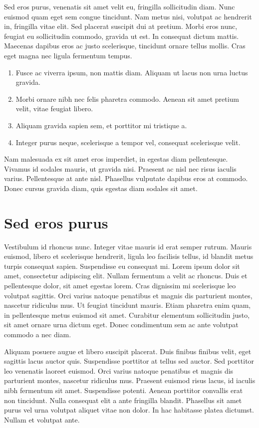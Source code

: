 \documentclass[a4paper, 12pt, notitlepage]{report}
\begin{document}
    Sed eros purus, venenatis sit amet velit eu, fringilla sollicitudin diam. Nunc euismod quam eget sem congue tincidunt. Nam metus nisi, volutpat ac hendrerit in, fringilla vitae elit. Sed placerat suscipit dui at pretium. Morbi eros nunc, feugiat eu sollicitudin commodo, gravida ut est. In consequat dictum mattis. Maecenas dapibus eros ac justo scelerisque, tincidunt ornare tellus mollis. Cras eget magna nec ligula fermentum tempus. 
    
    \begin{enumerate}
        \item Fusce ac viverra ipsum, non mattis diam. Aliquam ut lacus non urna luctus gravida.
        \item Morbi ornare nibh nec felis pharetra commodo. Aenean sit amet pretium velit, vitae feugiat libero.
        \item Aliquam gravida sapien sem, et porttitor mi tristique a.
        \item Integer purus neque, scelerisque a tempor vel, consequat scelerisque velit.
    \end{enumerate}

    Nam malesuada ex sit amet eros imperdiet, in egestas diam pellentesque. Vivamus id sodales mauris, ut gravida nisi. Praesent ac nisl nec risus iaculis varius. Pellentesque at ante nisl. Phasellus vulputate dapibus eros at commodo. Donec cursus gravida diam, quis egestas diam sodales sit amet. 

    \section{Sed eros purus}

    Vestibulum id rhoncus nunc. Integer vitae mauris id erat semper rutrum. Mauris euismod, libero et scelerisque hendrerit, ligula leo facilisis tellus, id blandit metus turpis consequat sapien. Suspendisse eu consequat mi. Lorem ipsum dolor sit amet, consectetur adipiscing elit. Nullam fermentum a velit ac rhoncus. Duis et pellentesque dolor, sit amet egestas lorem. Cras dignissim mi scelerisque leo volutpat sagittis. Orci varius natoque penatibus et magnis dis parturient montes, nascetur ridiculus mus. Ut feugiat tincidunt mauris. Etiam pharetra enim quam, in pellentesque metus euismod sit amet. Curabitur elementum sollicitudin justo, sit amet ornare urna dictum eget. Donec condimentum sem ac ante volutpat commodo a nec diam.

    Aliquam posuere augue et libero suscipit placerat. Duis finibus finibus velit, eget sagittis lacus auctor quis. Suspendisse porttitor at tellus sed auctor. Sed porttitor leo venenatis laoreet euismod. Orci varius natoque penatibus et magnis dis parturient montes, nascetur ridiculus mus. Praesent euismod risus lacus, id iaculis nibh fermentum sit amet. Suspendisse potenti. Aenean porttitor convallis erat non tincidunt. Nulla consequat elit a ante fringilla blandit. Phasellus sit amet purus vel urna volutpat aliquet vitae non dolor. In hac habitasse platea dictumst. Nullam et volutpat ante.
    
\end{document}
